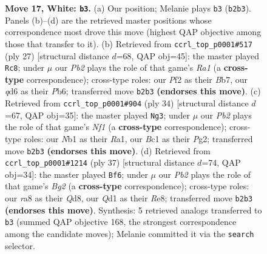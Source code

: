 \documentclass[11pt]{article}
\begin{document}
\begin{figure}[p]
\caption{\textbf{Move 17, White: \texttt{b3}.} (a) Our position; Melanie plays \texttt{b3} (\texttt{b2b3}). Panels (b)--(d) are the retrieved master positions whose correspondence most drove this move (highest QAP objective among those that transfer to it). (b) Retrieved from \texttt{ccrl\_top\_p0001\#517} (ply 27) [structural distance $d$=68, QAP obj=45]: the master played \texttt{Rc8}; under $\mu$ our \emph{Pb2} plays the role of that game's \emph{Ra1} (a \textbf{cross-type} correspondence); cross-type roles: our \emph{P}f2 as their \emph{B}b7, our \emph{q}d6 as their \emph{P}b6; transferred move \texttt{b2b3} \textbf{(endorses this move)}. (c) Retrieved from \texttt{ccrl\_top\_p0001\#904} (ply 34) [structural distance $d$=67, QAP obj=35]: the master played \texttt{Ng3}; under $\mu$ our \emph{Pb2} plays the role of that game's \emph{Nf1} (a \textbf{cross-type} correspondence); cross-type roles: our \emph{N}b1 as their \emph{R}a1, our \emph{B}c1 as their \emph{P}g2; transferred move \texttt{b2b3} \textbf{(endorses this move)}. (d) Retrieved from \texttt{ccrl\_top\_p0001\#1214} (ply 37) [structural distance $d$=74, QAP obj=34]: the master played \texttt{Bf6}; under $\mu$ our \emph{Pb2} plays the role of that game's \emph{Bg2} (a \textbf{cross-type} correspondence); cross-type roles: our \emph{r}a8 as their \emph{Q}d8, our \emph{Q}d1 as their \emph{R}e8; transferred move \texttt{b2b3} \textbf{(endorses this move)}. Synthesis: 5 retrieved analogs transferred to \texttt{b3} (summed QAP objective 168, the strongest correspondence among the candidate moves); Melanie committed it via the \texttt{search} selector.}
\label{fig:thought-m32}
\end{figure}

\clearpage
\end{document}
